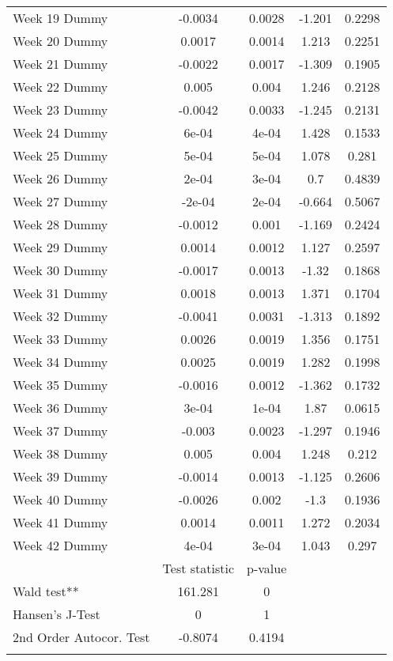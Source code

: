 \begin{longtable}{lcccc}
  Week 19 Dummy & -0.0034 & 0.0028 & -1.201 & 0.2298 \\ 
  Week 20 Dummy & 0.0017 & 0.0014 & 1.213 & 0.2251 \\ 
  Week 21 Dummy & -0.0022 & 0.0017 & -1.309 & 0.1905 \\ 
  Week 22 Dummy & 0.005 & 0.004 & 1.246 & 0.2128 \\ 
  Week 23 Dummy & -0.0042 & 0.0033 & -1.245 & 0.2131 \\ 
  Week 24 Dummy & 6e-04 & 4e-04 & 1.428 & 0.1533 \\ 
  Week 25 Dummy & 5e-04 & 5e-04 & 1.078 & 0.281 \\ 
  Week 26 Dummy & 2e-04 & 3e-04 & 0.7 & 0.4839 \\ 
  Week 27 Dummy & -2e-04 & 2e-04 & -0.664 & 0.5067 \\ 
  Week 28 Dummy & -0.0012 & 0.001 & -1.169 & 0.2424 \\ 
  Week 29 Dummy & 0.0014 & 0.0012 & 1.127 & 0.2597 \\ 
  Week 30 Dummy & -0.0017 & 0.0013 & -1.32 & 0.1868 \\ 
  Week 31 Dummy & 0.0018 & 0.0013 & 1.371 & 0.1704 \\ 
  Week 32 Dummy & -0.0041 & 0.0031 & -1.313 & 0.1892 \\ 
  Week 33 Dummy & 0.0026 & 0.0019 & 1.356 & 0.1751 \\ 
  Week 34 Dummy & 0.0025 & 0.0019 & 1.282 & 0.1998 \\ 
  Week 35 Dummy & -0.0016 & 0.0012 & -1.362 & 0.1732 \\ 
  Week 36 Dummy & 3e-04 & 1e-04 & 1.87 & 0.0615 \\ 
  Week 37 Dummy & -0.003 & 0.0023 & -1.297 & 0.1946 \\ 
  Week 38 Dummy & 0.005 & 0.004 & 1.248 & 0.212 \\ 
  Week 39 Dummy & -0.0014 & 0.0013 & -1.125 & 0.2606 \\ 
  Week 40 Dummy & -0.0026 & 0.002 & -1.3 & 0.1936 \\ 
  Week 41 Dummy & 0.0014 & 0.0011 & 1.272 & 0.2034 \\ 
  Week 42 Dummy & 4e-04 & 3e-04 & 1.043 & 0.297 \\ 
   & Test statistic & p-value &  &  \\ 
  Wald test** & 161.281 & 0 &  &  \\ 
  Hansen's J-Test & 0 & 1 &  &  \\ 
  2nd Order Autocor. Test & -0.8074 & 0.4194 &  &  \\ 
   \bottomrule
\caption{Results of two-step GMM estimation of policy, behavior and information on %
\label{tab_results:deaths_spec_7_full}
\end{longtable}
\endgroup
